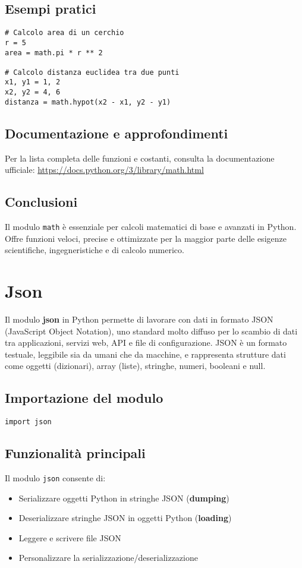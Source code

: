 \documentclass[a4paper,12pt]{article}
\begin{document}
\subsection*{Esempi pratici}
\begin{lstlisting}
# Calcolo area di un cerchio
r = 5
area = math.pi * r ** 2

# Calcolo distanza euclidea tra due punti
x1, y1 = 1, 2
x2, y2 = 4, 6
distanza = math.hypot(x2 - x1, y2 - y1)
\end{lstlisting}

\subsection*{Documentazione e approfondimenti}
Per la lista completa delle funzioni e costanti, consulta la documentazione ufficiale:
\url{https://docs.python.org/3/library/math.html}

\subsection*{Conclusioni}
Il modulo \texttt{math} è essenziale per calcoli matematici di base e avanzati in Python. Offre funzioni veloci, precise e ottimizzate per la maggior parte delle esigenze scientifiche, ingegneristiche e di calcolo numerico.

\section{Json}
Il modulo \textbf{json} in Python permette di lavorare con dati in formato JSON (JavaScript Object Notation), uno standard molto diffuso per lo scambio di dati tra applicazioni, servizi web, API e file di configurazione. JSON è un formato testuale, leggibile sia da umani che da macchine, e rappresenta strutture dati come oggetti (dizionari), array (liste), stringhe, numeri, booleani e null.

\subsection*{Importazione del modulo}
\begin{lstlisting}
import json
\end{lstlisting}

\subsection*{Funzionalità principali}
Il modulo \texttt{json} consente di:
\begin{itemize}
    \item Serializzare oggetti Python in stringhe JSON (\textbf{dumping})
    \item Deserializzare stringhe JSON in oggetti Python (\textbf{loading})
    \item Leggere e scrivere file JSON
    \item Personalizzare la serializzazione/deserializzazione
\end{itemize}
\end{document}
